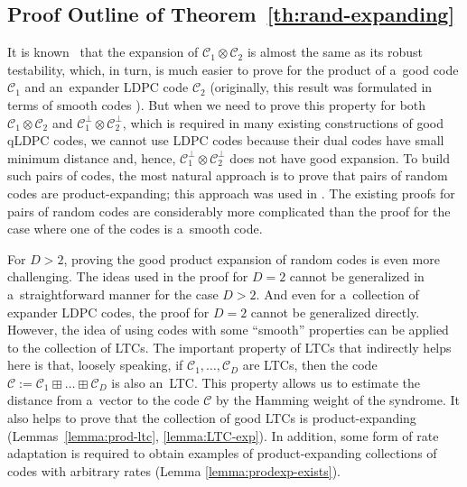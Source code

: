 \documentclass[conference]{IEEEtran}
\theoremstyle{plain}
\theoremstyle{definition}
\theoremstyle{remark}
\newcommand{\cC}{\mathcal{C}}
\begin{document}
\subsection{Proof Outline of Theorem~\ref{th:rand-expanding}}\label{sec:outline}




It is known~\cite{kalachevTwosidedRobustlyTestable2023} that the expansion of $\cC_1 \otimes \cC_2$ is almost the same as its robust testability, which, in turn, is much easier to prove for the product of a~good code $\cC_1$ and an~expander LDPC code $\cC_2$ (originally, this result was formulated in terms of smooth codes \cite{Ben-Sasson:2006}). But when we need to prove this property for both $\cC_1 \otimes \cC_2$ and $\cC_1^\bot \otimes \cC_2^\bot$, which is required in many existing constructions of good qLDPC codes, we cannot use LDPC codes because their dual codes have small minimum distance and, hence, $\cC_1^\bot \otimes \cC_2^\bot$ does not have good expansion. To build such pairs of codes, the most natural approach is to prove that pairs of random codes are product-expanding; this approach was used in \cite{Panteleev&Kalachev:stoc2022,Dinur:decoders,kalachevTwosidedRobustlyTestable2023}. The existing proofs for pairs of random codes are considerably more complicated than the proof for the case where one of the codes is a~smooth code.

For $D > 2$, proving the good product expansion of random codes is even more challenging. The ideas used in the proof for $D=2$ cannot be generalized in a~straightforward manner for the case $D>2$. 
And even for a~collection of expander LDPC codes, the proof for $D=2$ cannot be generalized directly. 
However, the idea of using codes with some ``smooth'' properties can be applied to the collection of LTCs. 
The important property of LTCs that indirectly helps here is that, loosely speaking, if $\cC_1,\dots,\cC_D$ are LTCs, then the code $\cC:=\cC_1\boxplus\dots\boxplus\cC_D$ is also an~LTC. 
This property allows us to estimate the distance from a~vector to the code $\cC$ by the Hamming weight of the syndrome. 
It also helps to prove that the collection of good LTCs is product-expanding (Lemmas~\ref{lemma:prod-ltc}, \ref{lemma:LTC-exp}). In addition, some form of rate adaptation is required to obtain examples of product-expanding collections of codes with arbitrary rates (Lemma \ref{lemma:prodexp-exists}).
\end{document}
